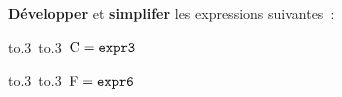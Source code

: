 \documentclass[exercice]{thedocument}%
\begin{document}
%
{\bfseries Développer} et {\bfseries simplifer} les expressions suivantes~:\par\vskip10pt\noindent
\hbox{\hbox to.3%
\hbox to.3%
$\text{C}=\<expr3;$}\par\vskip5pt\noindent
\hbox{\hbox to.3%
\hbox to.3%
$\text{F}=\<expr6;$}\par\noindent
\end{document}
